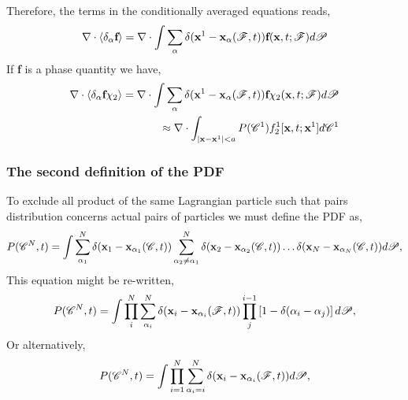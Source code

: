 Therefore, the terms in the conditionally averaged equations reads, 
\begin{equation*}
    \mathbf{\nabla}\cdot  \left<\delta_\alpha \textbf f \right>
    = \mathbf{\nabla}\cdot
    \int 
    \sum_\alpha \delta(\textbf{x}^1 - \textbf{x}_\alpha(\mathscr{F},t)) 
      \textbf f (\textbf{x},t;\mathscr{F}) 
    d\mathscr{P}
\end{equation*}
If \textbf{f} is a phase quantity we have, 
\begin{align*}
    \mathbf{\nabla}\cdot  \left<\delta_\alpha \textbf f \chi_2 \right>
    = \mathbf{\nabla}\cdot
    \int 
    \sum_\alpha \delta(\textbf{x}^1 - \textbf{x}_\alpha(\mathscr{F},t)) 
      \textbf f \chi_2  (\textbf{x},t;\mathscr{F}) 
    d\mathscr{P}\\
    \approx \mathbf{\nabla}\cdot
    \int_{|\textbf{x} - \textbf{x}^1| < a} 
    P(\mathscr{C}^1)
    f_2^1[\textbf{x},t;\textbf{x}^1]
    d\mathscr{C}^1
\end{align*}

\subsubsection*{The second definition of the PDF}
To exclude all product of the same Lagrangian particle such that pairs distribution concerns actual pairs of particles we must define the PDF as, 
\begin{equation*}
    P(\mathscr{C}^N,t)
    = \int 
    \sum_{\alpha_1}^{N}\delta(\textbf{x}_1 - \textbf{x}_{\alpha_1}(\mathscr{C},t))
    \sum_{\alpha_2\neq\alpha_1}^{N}\delta(\textbf{x}_2 - \textbf{x}_{\alpha_2}(\mathscr{C},t))
    \ldots
    \delta(\textbf{x}_N - \textbf{x}_{\alpha_N}(\mathscr{C},t))
    d\mathscr{P},
\end{equation*}
This equation might be re-written, 
\begin{equation*}
    P(\mathscr{C}^N,t)
    = \int 
    \prod_i^N
    \sum_{\alpha_i}^{N}\delta(\textbf{x}_i - \textbf{x}_{\alpha_i}(\mathscr{F},t))
    \prod_j^{i-1}\left[1 -  \delta(\alpha_i-\alpha_j)\right]
    d\mathscr{P},
\end{equation*}
Or alternatively, 
\begin{equation*}
    P(\mathscr{C}^N,t)
    = \int 
    \prod_{i=1}^N
    \sum_{\alpha_i = i }^{N}\delta(\textbf{x}_i - \textbf{x}_{\alpha_i}(\mathscr{F},t))
    d\mathscr{P},
\end{equation*}

